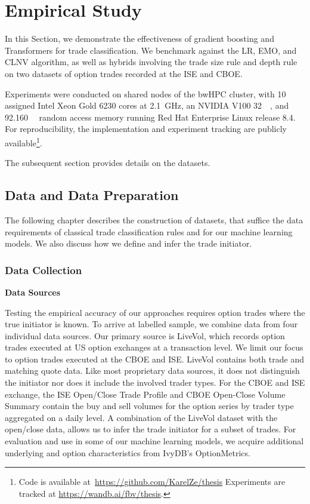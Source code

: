 \newpage
{}
\section{Empirical Study}\label{sec:empirical-study}

In this Section, we demonstrate the effectiveness of gradient boosting and Transformers for trade classification. We benchmark against the \gls{LR}, \gls{EMO}, and \gls{CLNV} algorithm, as well as hybrids involving the trade size rule and depth rule on two datasets of option trades recorded at the \gls{ISE} and \gls{CBOE}.

Experiments were conducted on shared nodes of the bwHPC cluster, with 10 assigned Intel Xeon Gold 6230 cores at \SI{2.1}{\GHz}, an NVIDIA V100 \SI{32}{\giga\byte}, and \SI{92.160}{\giga\byte} random access memory running Red Hat Enterprise Linux release 8.4. For reproducibility, the implementation and experiment tracking are publicly available\footnote{Code is available at~\url{https://github.com/KarelZe/thesis} Experiments are tracked at \url{https://wandb.ai/fbv/thesis}.}.

The subsequent section provides details on the datasets.

\subsection{Data and Data Preparation}\label{sec:data-and-data-preparation}

The following chapter describes the construction of datasets, that suffice the data requirements of classical trade classification rules and for our machine learning models. We also discuss how we define and infer the trade initiator.

\subsubsection{Data Collection}\label{sec:data-collection}

\textbf{Data Sources}

Testing the empirical accuracy of our approaches requires option trades where the true initiator is known. To arrive at labelled sample, we combine data from four individual data sources. Our primary source is LiveVol, which records option trades executed at US option exchanges at a transaction level. We limit our focus to option trades executed at the \gls{CBOE} and \gls{ISE}. LiveVol contains both trade and matching quote data. Like most proprietary data sources, it does not distinguish the initiator nor does it include the involved trader types. For the \gls{CBOE} and \gls{ISE} exchange, the \gls{ISE} Open/Close Trade Profile and \gls{CBOE} Open-Close Volume Summary contain the buy and sell volumes for the option series by trader type aggregated on a daily level. A combination of the LiveVol dataset with the open/close data, allows us to infer the trade initiator for a subset of trades. For evaluation and use in some of our machine learning models, we acquire additional underlying and option characteristics from IvyDB's OptionMetrics.

